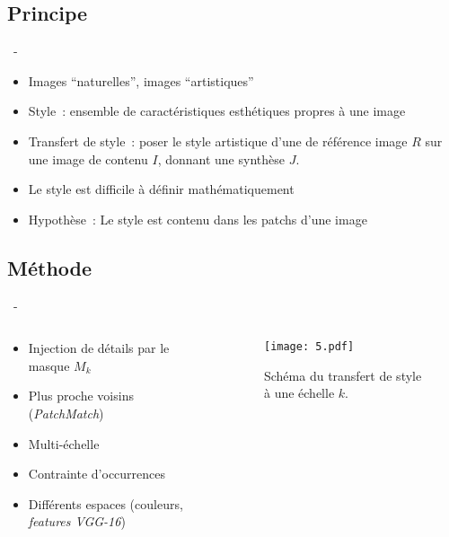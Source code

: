 \documentclass[aspectratio=169, 22pt]{beamer}
\begin{document}
\subsection{Principe}
\begin{frame}{\secname~- \subsecname}
  \begin{itemize}
  \item Images ``naturelles'', images ``artistiques'' 
  \item Style : ensemble de \alert{caractéristiques esthétiques} propres à une image
  \item Transfert de style : poser le style artistique d'une de
    référence image $R$ sur une image de contenu $I$, donnant une synthèse
    $J$.
    \vspace{1em}
  \item Le style est \alert{difficile à définir mathématiquement}
  \item Hypothèse : Le style est contenu dans les patchs d'une image
  \end{itemize}
\end{frame}

\subsection{Méthode}
\begin{frame}{\secname~- \subsecname}
  \begin{columns}
    \begin{column}{0.3\linewidth}
      \begin{itemize}
      \item Injection de détails par le masque $M_k$
      \item Plus proche voisins (\emph{PatchMatch})
      \item Multi-échelle
      \item Contrainte d'occurrences
      \item Différents espaces (couleurs, \emph{features VGG-16})
      \end{itemize}
    \end{column}
    \begin{column}{0.7\linewidth}
      \begin{figure}
        \centering
        \texttt{[image: 5.pdf]}
        \caption{Schéma du transfert de style à une échelle $k$.}
      \end{figure}
    \end{column}
  \end{columns}
\end{frame}
\end{document}

